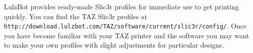 
LulzBot provides ready-made Slic3r profiles for immediate use to get printing quickly. You can find the TAZ Slic3r profiles at \texttt{http://download.lulzbot.com/TAZ/software/current/slic3r/config/}. Once you have become familiar with your TAZ printer and the software you may want to make your own profiles with slight adjustments for particular designs.

%










